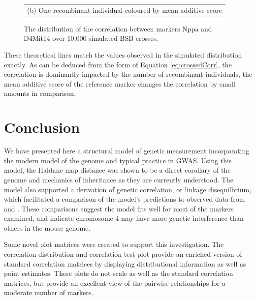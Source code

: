 \documentclass[sts]{imsart}
\begin{document}
\begin{figure}[htp]
\begin{center}
\begin{tabular}{c}
      {\footnotesize (b) One recombinant individual coloured by mean additive score}
    \end{tabular}
  \end{center}
  \caption{The distribution of the correlation between markers Nppa and D4Mit14 over 10,000 simulated BSB crosses.}
  \label{fig:bardetail}
\end{figure}
These theoretical lines match the values observed in the simulated distribution exactly. As can be deduced from the form of Equation \ref{eq:crossedCorr}, the correlation is dominantly impacted by the number of recombinant individuals, the mean additive score of the reference marker changes the correlation by small amounts in comparison.


\section{Conclusion} \label{sec:conclusion}

We have presented here a structural model of genetic measurement incorporating the modern model of the genome and typical practice in GWAS. Using this model, the Haldane map distance was shown to be a direct corollary of the genome and mechanics of inheritance as they are currently understood. The model also supported a derivation of genetic correlation, or linkage disequilbrium, which facilitated a comparison of the model's predictions to observed data from \cite{roweetal1994jaxbsb} and \cite{welchetal1996uclabsb}. These comparisons suggest the model fits well for most of the markers examined, and indicate chromosome 4 may have more genetic interference than others in the mouse genome.

Some novel plot matrices were created to support this investigation. The correlation distribution and correlation test plot provide an enriched version of standard correlation matrices by displaying distributional information as well as point estimates. These plots do not scale as well as the standard correlation matrices, but provide an excellent view of the pairwise relationships for a moderate number of markers.
\end{document}
